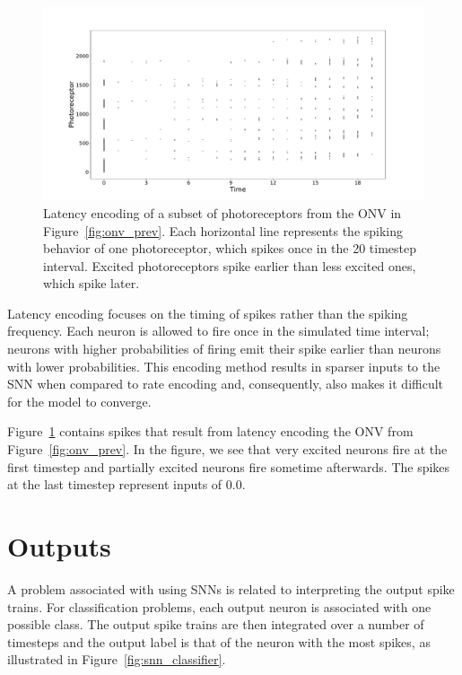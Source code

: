 \documentclass [MS] {UCLAthesis}
\begin{document}
\begin{figure}
    \centering
    \includegraphics[width=\textwidth]{onv_latency_prev}
    \caption[Latency encoded ONV]{Latency encoding of a subset of photoreceptors from the ONV in Figure~\ref{fig:onv_prev}. Each horizontal line represents the spiking behavior of one photoreceptor, which spikes once in the 20 timestep interval. Excited photoreceptors spike earlier than less excited ones, which spike later.}
    \label{fig:onv_encode_latency}
\end{figure}

Latency encoding focuses on the timing of spikes rather than the spiking frequency. Each neuron is allowed to fire once in the simulated time interval; neurons with higher probabilities of firing emit their spike earlier than neurons with lower probabilities. This encoding method results in sparser inputs to the SNN when compared to rate encoding and, consequently, also makes it difficult for the model to converge.

Figure~\ref{fig:onv_encode_latency} contains spikes that result from latency encoding the ONV from Figure~\ref{fig:onv_prev}. In the figure, we see that very excited neurons fire at the first timestep and partially excited neurons fire sometime afterwards. The spikes at the last timestep represent inputs of 0.0.


\section{Outputs}

A problem associated with using SNNs is related to interpreting the output spike trains. For classification problems, each output neuron is associated with one possible class. The output spike trains are then integrated over a number of timesteps and the output label is that of the neuron with the most spikes, as illustrated in Figure~\ref{fig:snn_classifier}. 
\end{document}
